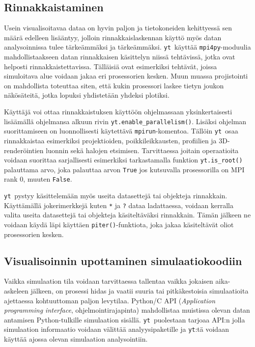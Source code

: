 \documentclass[12pt,a4paper]{article}
\newcommand{\yt}{\texttt{yt}}
\begin{document}
\subsection{Rinnakkaistaminen}
Usein visualisoitavaa dataa on hyvin paljon ja tietokoneiden kehittyessä sen määrä edelleen lisääntyy, jolloin rinnakkaislaskennan käyttö myös datan analysoinnissa tulee tärke\-äm\-mäksi ja tärkeämmäksi. \yt\ käyttää \texttt{mpi4py}-moduulia mahdollistaakseen datan rinnakkaisen käsittelyn niissä tehtävissä, jotka ovat helposti rinnakkaistettavissa. Tälläisiä ovat esimerkiksi tehtävät, joissa simuloitava alue voidaan jakaa eri prosessorien kesken. Muun muassa projistointi on mahdollista toteuttaa siten, että kukin prosessori laskee tietyn joukon näkösäteitä, jotka lopuksi yhdistetään yhdeksi plotiksi. \cite{yt}

Käyttäjä voi ottaa rinnakkaistuksen käyttöön ohjelmassaan yksinkertaisesti lisäämällä ohjelmansa alkuun rivin \texttt{yt.enable\_parallelism()}. Lisäksi ohjelman suorittamiseen on luonnollisesti käytettävä \texttt{mpirun}-komentoa. Tällöin \yt\ osaa rinnakkaistaa esimerkiksi projektioiden, poikkileikkausten, profiilien ja 3D-renderöintien luonnin sekä halojen etsimisen. Tarvittaessa joitain operaatioita voidaan suorittaa sarjallisesti esimerkiksi tarkastamalla funktion \texttt{yt.is\_root()} palauttama arvo, joka palauttaa arvon \texttt{True} jos kutsuvalla prosessorilla on MPI rank 0, muuten \texttt{False}. \cite{yt, parallel}

\yt\ pystyy käsittelemään myös useita datasettejä tai objekteja rinnakkain. Käyttämällä jokerimerkkejä kuten \texttt{*} ja \texttt{?} dataa ladattaessa, voidaan kerralla valita useita datasettejä tai objekteja käsiteltäväksi rinnakkain. Tämän jälkeen ne voidaan käydä läpi käyttäen \texttt{piter()}-funktiota, joka jakaa käsiteltävät oliot prosessorien kesken. \cite{parallel} %

\subsection{Visualisoinnin upottaminen simulaatiokoodiin}
Vaikka simulaation tila voidaan tarvittaessa tallentaa vaikka jokaisen aika-askeleen jälkeen, on prosessi hidas ja vaatii suuria tai pitkäkestoisia simulaatioita ajettaessa kohtuuttoman paljon levytilaa. Python/C API (\textit{Application programming interface}, ohjelmointirajapinta) mahdollistaa muistissa olevan datan antamisen Python-tulkille simulaation sisällä. \yt\ puolestaan tarjoaa API:n jolla simulaation informaatio voidaan välittää analyysipaketille ja \yt :tä voidaan käyttää ajossa olevan simulaation analysointiin. \cite{yt}
\end{document}
